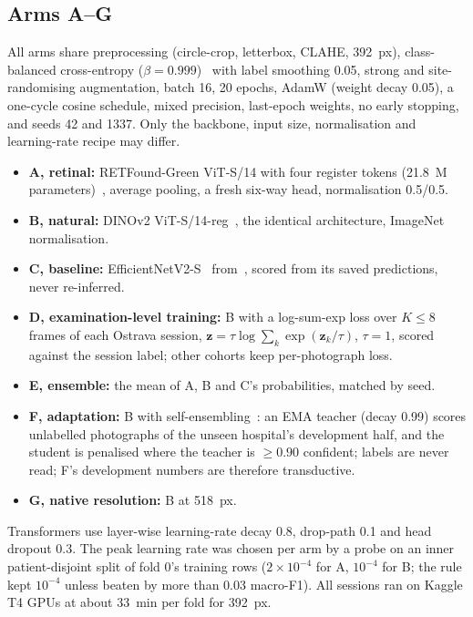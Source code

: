 \documentclass[conference]{IEEEtran}
\begin{document}
\subsection{Arms A--G}
All arms share preprocessing (circle-crop, letterbox, CLAHE, 392~px), class-balanced cross-entropy ($\beta=0.999$)~\cite{cui2019} with label smoothing 0.05, strong and site-randomising augmentation, batch 16, 20 epochs, AdamW (weight decay 0.05), a one-cycle cosine schedule, mixed precision, last-epoch weights, no early stopping, and seeds 42 and 1337. Only the backbone, input size, normalisation and learning-rate recipe may differ.
\begin{itemize}
\item \textbf{A, retinal:} RETFound-Green ViT-S/14 with four register tokens (21.8~M parameters)~\cite{engelmann2025}, average pooling, a fresh six-way head, normalisation 0.5/0.5.
\item \textbf{B, natural:} DINOv2 ViT-S/14-reg~\cite{oquab2024}, the identical architecture, ImageNet normalisation.
\item \textbf{C, baseline:} EfficientNetV2-S~\cite{tan2021} from~\cite{nagpure2026}, scored from its saved predictions, never re-inferred.
\item \textbf{D, examination-level training:} B with a log-sum-exp loss over $K\le8$ frames of each Ostrava session, $\mathbf{z}=\tau\log\sum_k\exp(\mathbf{z}_k/\tau)$, $\tau=1$, scored against the session label; other cohorts keep per-photograph loss.
\item \textbf{E, ensemble:} the mean of A, B and C's probabilities, matched by seed.
\item \textbf{F, adaptation:} B with self-ensembling~\cite{french2018}: an EMA teacher (decay 0.99) scores unlabelled photographs of the unseen hospital's development half, and the student is penalised where the teacher is $\ge0.90$ confident; labels are never read; F's development numbers are therefore transductive.
\item \textbf{G, native resolution:} B at 518~px.
\end{itemize}
Transformers use layer-wise learning-rate decay 0.8, drop-path 0.1 and head dropout 0.3. The peak learning rate was chosen per arm by a probe on an inner patient-disjoint split of fold 0's training rows ($2\times10^{-4}$ for A, $10^{-4}$ for B; the rule kept $10^{-4}$ unless beaten by more than 0.03 macro-F1). All sessions ran on Kaggle T4 GPUs at about 33~min per fold for 392~px.
\end{document}

